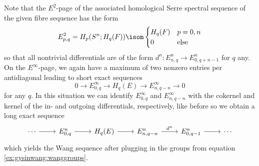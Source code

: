 \begin{solution}
\begin{enumerate}
			Note that the $E^2$-page of the associated homological Serre spectral sequence of the given fibre sequence has the form
			\begin{equation}\label{ex:gysinwang:wanggroups}
				E^2_{p, q} = H_p(S^n; H_q(F)) \isom \begin{cases}
					H_q(F)  & p = 0, n \\
					0 		& \text{else}
				\end{cases}
			\end{equation}
			so that all nontrivial differentials are of the form $d^n\colon E^n_{n, q} \to E^n_{0, q + n - 1}$ for $q$ any.
			On the $E^\infty$-page, we again have a maximum of two nonzero entries per antidiagonal leading to short exact sequences
			\begin{equation*}
				0 \to E^\infty_{0, q} \to H_q(E) \to E^\infty_{n, q - n} \to 0
			\end{equation*}
			for any $q$.
			In this situation we can identify $E^\infty_{0, q}$ and $E^\infty_{n, q - n}$ with the cokernel and kernel of the in- and outgoing differentials, respectively, like before so we obtain a long exact sequence
			\begin{equation*}
				\begin{tikzcd}
					\cdots 
							\ar[r]
						& E^n_{0, q}
							\ar[r]
						& H_q(E)
							\ar[r]
						& E^n_{n, q - n}
							\ar[r, "d^n"]
						& E^n_{0, q - 1}
							\ar[r]
						& \cdots
				\end{tikzcd}
			\end{equation*}
			which yields the Wang sequence after plugging in the groups from equation \eqref{ex:gysinwang:wanggroups}.
			\qedhere
	\end{enumerate}
\end{solution}


